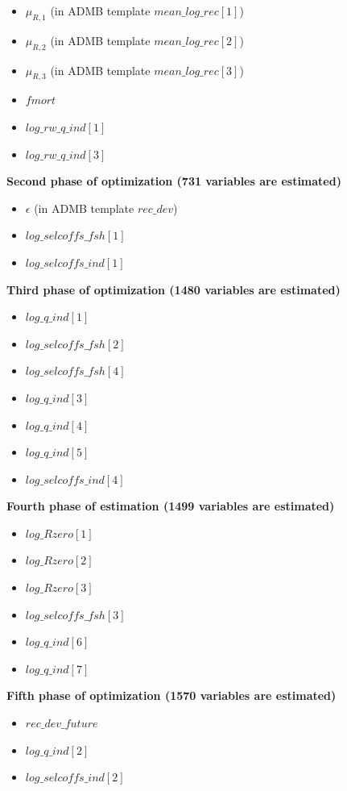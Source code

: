 \documentclass{article}
\begin{document}
\begin{itemize}
    \item $\mu_{R,1}$ (in ADMB template $mean\_log\_rec[1]$)
    \item $\mu_{R,2}$ (in ADMB template $mean\_log\_rec[2]$)
    \item $\mu_{R,3}$ (in ADMB template $mean\_log\_rec[3]$)
    \item $fmort$
    \item $log\_rw\_q\_ind[1]$
    \item $log\_rw\_q\_ind[3]$
\end{itemize}

\textbf{Second phase of optimization (731 variables are estimated)}
\begin{itemize}
    \item $\epsilon$ (in ADMB template $rec\_dev$)
    \item $log\_selcoffs\_fsh[1]$
    \item $log\_selcoffs\_ind[1]$
\end{itemize}

\textbf{Third phase of optimization (1480 variables are estimated)}
\begin{itemize}
    \item $log\_q\_ind[1]$
    \item $log\_selcoffs\_fsh[2]$
    \item $log\_selcoffs\_fsh[4]$
    
    \item $log\_q\_ind[3]$
    \item $log\_q\_ind[4]$
    \item $log\_q\_ind[5]$
    \item $log\_selcoffs\_ind[4]$
\end{itemize}
\textbf{Fourth phase of estimation (1499 variables are estimated)}
\begin{itemize}
    \item $log\_Rzero[1]$
    \item $log\_Rzero[2]$
    \item $log\_Rzero[3]$
    \item $log\_selcoffs\_fsh[3]$
    
    \item $log\_q\_ind[6]$
    \item $log\_q\_ind[7]$
\end{itemize}

\textbf{Fifth phase of optimization (1570 variables are estimated)}
\begin{itemize}
    \item $rec\_dev\_future$
    \item $log\_q\_ind[2]$
    \item $log\_selcoffs\_ind[2]$
\end{itemize}
\end{document}
